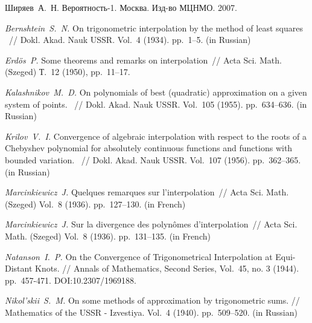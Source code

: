 \begin{thebibliography}{111}
Ширяев~А.~Н. Вероятность-1. Москва. Изд-во МЦНМО. 2007.


\textit{Bernshtein~S.~N.} 
On trigonometric interpolation by the method of least squares
~// Dokl. Akad. Nauk USSR. Vol.~4 (1934). pp.~1--5. (in Russian) 

\textit{Erd{\"o}s~P.} Some theorems and remarks on interpolation~// Acta Sci. Math. (Szeged) Т.~12 (1950), pp.~11--17. 


\textit{Kalashnikov~M.~D.} 
On polynomials of best (quadratic) approximation on a given system of points.
~// Dokl. Akad. Nauk USSR. Vol.~105 (1955). pp.~634--636. (in Russian)

\textit{Krilov~V.~I.} 
Convergence of algebraic interpolation with respect to the roots of a Chebyshev polynomial for absolutely continuous functions and functions with bounded variation.
~// Dokl. Akad. Nauk USSR. Vol.~107 (1956). pp.~362--365. (in Russian)

\textit{Marcinkiewicz~J.} Quelques remarques sur l'interpolation~// Acta Sci. Math. (Szeged) Vol.~8 (1936). pp.~127--130. (in French)

\textit{Marcinkiewicz~J.} Sur la divergence des polyn{\^o}mes d'interpolation~// Acta Sci. Math. (Szeged) Vol.~8 (1936). pp.~131--135. (in French)

\textit{Natanson~I.~P.} On the Convergence of Trigonometrical Interpolation at Equi-Distant Knots. // Annals of Mathematics, Second Series, Vol.~45, no. 3 (1944). pp.~457-471. DOI:10.2307/1969188.

\textit{Nikol'skii~S.~M.} On some methods of approximation by trigonometric sums. // Mathematics of the USSR - Izvestiya. Vol.~4 (1940). pp.~509--520. (in Russian) 


\end{thebibliography}
